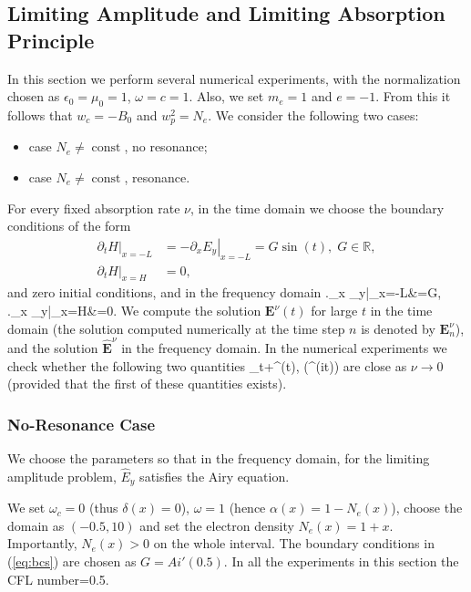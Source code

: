 \subsection{Limiting Amplitude and Limiting Absorption Principle}
In this section we perform several numerical experiments,
with the normalization chosen as $\epsilon_0=\mu_0=1$, $\omega=c=1$. 
Also, we set $m_e=1$ and $e=-1$. From this it follows that $w_c=-B_0$ and $w_p^2=N_e$. 
We consider the following two cases:
\begin{itemize}
 \item case $N_e\neq \operatorname{const}$, no resonance;
 \item case $N_e\neq \operatorname{const}$, resonance.
\end{itemize}
For every fixed absorption rate $\nu$, in the time domain we choose the boundary conditions of the form
\begin{align}
\label{eq:bcs}
\left.\partial_t H\right|_{x=-L}&=-\left.\partial_x E_y\right|_{x=-L}=G\sin(t),\; G\in \mathbb{R}, \\
 \nonumber
 \left.\partial_t H\right|_{x=H}&=0,
\end{align}
and zero initial conditions, and in the frequency domain
\bealn
 \left.\partial_x _y\right|_{x=-L}&=G,\\
 \left.\partial_x _y\right|_{x=H}&=0.
\eealn
We compute the solution $\mathbf{E}^{\nu}(t)$ for large $t$ in the time domain (the solution computed numerically at the time step $n$ is denoted by $\mathbf{E}^{\nu}_{n}$), and the solution $\hat{\mathbf{E}}^{\nu}$ in the frequency domain. 
In the numerical experiments we check whether the following two quantities
\ben
\lim_{t\rightarrow+\infty}^{\nu}(t),  \Im\left(^{\nu}\exp(it)\right)
\een
are close as $\nu\rightarrow 0$ (provided that the first of these quantities exists). 
\subsubsection{No-Resonance Case}
We choose the parameters so that in the frequency domain, for the limiting amplitude problem, $\hat{E}_{y}$ satisfies 
the Airy equation. 

We set $\omega_c=0$ (thus $\delta(x)=0$), $\omega=1$ (hence $\alpha(x)=1-N_e(x)$), 
choose the domain as $(-0.5, 10)$ and set the electron density $N_e(x)=1+x$. Importantly, $N_e(x)>0$ on the whole interval.
The boundary conditions in (\ref{eq:bcs}) are chosen as $G=Ai'(0.5)$. 
In all the experiments in this section the CFL number=0.5.


